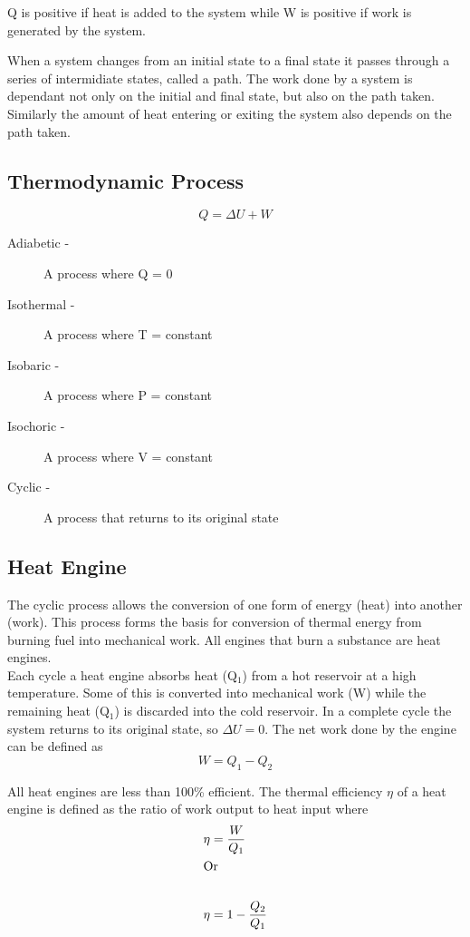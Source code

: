 \documentclass[a4paper, 12pt]{article}
\begin{document}
			Q is positive if heat is added to the system while W is positive if work is generated by the system. \\
			\par
			When a system changes from an initial state to a final state it passes through a series of intermidiate states, called a path. The work done by a system is dependant not only on the initial and final state, but also on the path taken. Similarly the amount of heat entering or exiting the system also depends on the path taken.
						
		\subsection{Thermodynamic Process}
		\[Q = \Delta U + W \]
			\begin{description}
				\item[Adiabetic - ] A process where Q = 0
				\item[Isothermal - ] A process where T = constant
				\item[Isobaric - ] A process where P = constant
				\item[Isochoric - ] A process where V = constant
				\item[Cyclic - ] A process that returns to its original state
			\end{description}
	\subsection{Heat Engine}
		The cyclic process allows the conversion of one form of energy (heat) into another (work). This process forms the basis for conversion of thermal energy from burning fuel into mechanical work. All engines that burn a substance are heat engines. \\
		Each cycle a heat engine absorbs heat (Q$_1$) from a hot reservoir at a high temperature. Some of this is converted into mechanical work (W) while the remaining heat (Q$_1$) is discarded into the cold reservoir. In a complete cycle the system returns to its original state, so $\Delta U = 0$. The net work done by the engine can be defined as 
		\[W=Q_1 - Q_2 \]
		\par
		All heat engines are less than 100\% efficient. The thermal efficiency $\eta$ of a heat engine is defined as the ratio of work output to heat input where \\
		\begin{align*}
			\eta &=\frac{W}{Q_1} \\
			\intertext{Or} \\
			\eta &= 1- \frac{Q_2}{Q_1} \\
		\end{align*}
		
\end{document}
